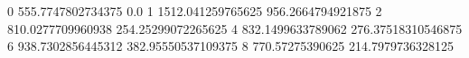 0 555.7747802734375 0.0
1 1512.041259765625 956.2664794921875
2 810.0277709960938 254.25299072265625
4 832.1499633789062 276.37518310546875
6 938.7302856445312 382.95550537109375
8 770.57275390625 214.7979736328125
